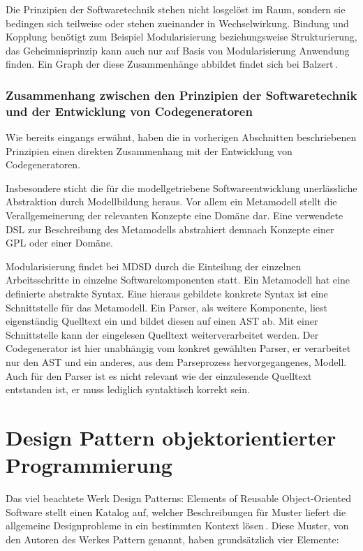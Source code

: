 \documentclass[12pt,oneside,a4paper,parskip]{scrbook}
\begin{document}
Die Prinzipien der Softwaretechnik stehen nicht losgelöst im Raum, sondern sie bedingen sich teilweise oder stehen zueinander in Wechselwirkung. Bindung und Kopplung benötigt zum Beispiel Modularisierung beziehungsweise Strukturierung, das Geheimnisprinzip kann auch nur auf Basis von Modularisierung Anwendung finden. Ein Graph der diese Zusammenhänge abbildet findet sich bei Balzert\,\cite[S. 49]{balzert2009a}.

\subsubsection{Zusammenhang zwischen den Prinzipien der Softwaretechnik und der Entwicklung von Codegeneratoren}

Wie bereits eingangs erwähnt, haben die in vorherigen Abschnitten beschriebenen Prinzipien einen direkten Zusammenhang mit der Entwicklung von Codegeneratoren.

Insbesondere sticht die für die modellgetriebene Softwareentwicklung unerlässliche Abstraktion durch Modellbildung heraus. Vor allem ein Metamodell stellt die Verallgemeinerung der relevanten Konzepte eine Domäne dar. Eine verwendete DSL zur Beschreibung des Metamodells abstrahiert demnach Konzepte einer GPL oder einer Domäne.

Modularisierung findet bei MDSD durch die Einteilung der einzelnen Arbeitsschritte in einzelne Softwarekomponenten statt. Ein Metamodell hat eine definierte abstrakte Syntax. Eine hieraus gebildete konkrete Syntax ist eine Schnittstelle für das Metamodell. Ein Parser, als weitere Komponente, liest eigenständig Quelltext ein und bildet diesen auf einen AST ab. Mit einer Schnittstelle kann der eingelesen Quelltext weiterverarbeitet werden. Der Codegenerator ist hier unabhängig vom konkret gewählten Parser, er verarbeitet nur den AST und ein anderes, aus dem Parseprozess hervorgegangenes, Modell. Auch für den Parser ist es nicht relevant wie der einzulesende Quelltext entstanden ist, er muss lediglich syntaktisch korrekt sein.

\section{Design Pattern objektorientierter Programmierung}

Das viel beachtete Werk Design Patterns: Elements of Reusable Object-Oriented Software stellt einen Katalog auf, welcher Beschreibungen für Muster liefert die allgemeine Designprobleme in ein bestimmten Kontext lösen\,\cite{gamma1995}. Diese Muster, von den Autoren des Werkes Pattern genannt, haben grundsätzlich vier Elemente: 
\end{document}
